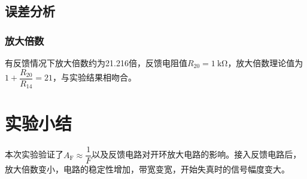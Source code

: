 \subsection{误差分析}%
\label{sub:\arabic{chapter}误差分析}

\subsubsection{放大倍数}%
\label{ssub:放大倍数}

有反馈情况下放大倍数约为21.216倍，反馈电阻值$ R_{20} = \SI{1}{\kohm} $，放大倍数理论值为$ 1 + \dfrac{R_{20}}{R_{14}} = 21 $，与实验结果相吻合。

\section{实验小结}%
\label{sec:\arabic{chapter}实验小结}

本次实验验证了$ A_\mathrm{F}\approx\dfrac{1}{F} $以及反馈电路对开环放大电路的影响。接入反馈电路后，放大倍数变小，电路的稳定性增加，带宽变宽，开始失真时的信号幅度变大。

